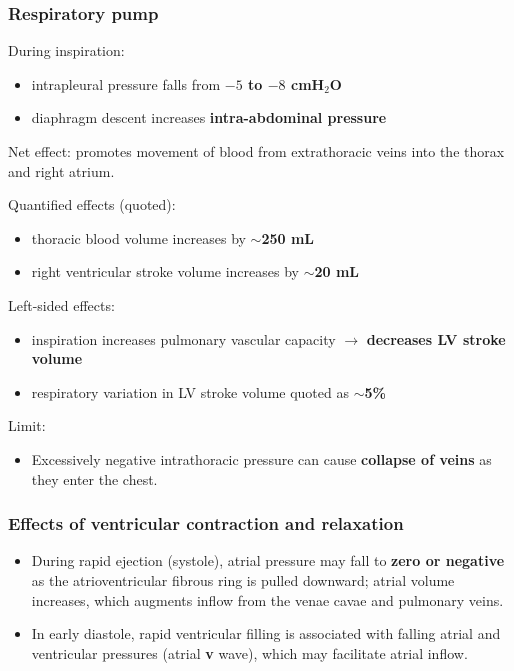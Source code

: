 \documentclass[11pt,a4paper]{article}
\begin{document}
\subsubsection{Respiratory pump}
During inspiration:
\begin{itemize}
\item intrapleural pressure falls from \textbf{$-5$ to $-8$ cmH$_2$O}
\item diaphragm descent increases \textbf{intra-abdominal pressure}
\end{itemize}
Net effect: promotes movement of blood from extrathoracic veins into the thorax and right atrium.

Quantified effects (quoted):
\begin{itemize}
\item thoracic blood volume increases by \textbf{$\sim$250 mL}
\item right ventricular stroke volume increases by \textbf{$\sim$20 mL}
\end{itemize}

Left-sided effects:
\begin{itemize}
\item inspiration increases pulmonary vascular capacity $\rightarrow$ \textbf{decreases LV stroke volume}
\item respiratory variation in LV stroke volume quoted as \textbf{$\sim$5\%}
\end{itemize}

Limit:
\begin{itemize}
\item Excessively negative intrathoracic pressure can cause \textbf{collapse of veins} as they enter the chest.
\end{itemize}

\subsubsection{Effects of ventricular contraction and relaxation}
\begin{itemize}
\item During rapid ejection (systole), atrial pressure may fall to \textbf{zero or negative} as the atrioventricular fibrous ring is pulled downward; atrial volume increases, which augments inflow from the venae cavae and pulmonary veins.
\item In early diastole, rapid ventricular filling is associated with falling atrial and ventricular pressures (atrial \textbf{v} wave), which may facilitate atrial inflow.
\end{itemize}
\end{document}
